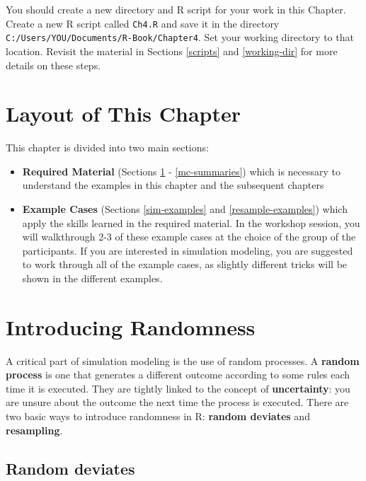 \documentclass[]{book}
\theoremstyle{definition}
\theoremstyle{definition}
\theoremstyle{definition}
\theoremstyle{remark}
\begin{document}
You should create a new directory and R script for your work in this
Chapter. Create a new R script called \texttt{Ch4.R} and save it in the
directory \texttt{C:/Users/YOU/Documents/R-Book/Chapter4}. Set your
working directory to that location. Revisit the material in Sections
\ref{scripts} and \ref{working-dir} for more details on these steps.

\section*{Layout of This Chapter}\label{layout-of-this-chapter}

This chapter is divided into two main sections:

\begin{itemize}
\item
  \textbf{Required Material} (Sections \ref{randomness} -
  \ref{mc-summaries}) which is necessary to understand the examples in
  this chapter and the subsequent chapters
\item
  \textbf{Example Cases} (Sections \ref{sim-examples} and
  \ref{resample-examples}) which apply the skills learned in the
  required material. In the workshop session, you will walkthrough 2-3
  of these example cases at the choice of the group of the participants.
  If you are interested in simulation modeling, you are suggested to
  work through all of the example cases, as slightly different tricks
  will be shown in the different examples.
\end{itemize}

\section{Introducing Randomness}\label{randomness}

A critical part of simulation modeling is the use of random processes. A
\textbf{random process} is one that generates a different outcome
according to some rules each time it is executed. They are tightly
linked to the concept of \textbf{uncertainty}: you are unsure about the
outcome the next time the process is executed. There are two basic ways
to introduce randomness in R: \textbf{random deviates} and
\textbf{resampling}.

\subsection{Random deviates}\label{random-deviates}
\end{document}
